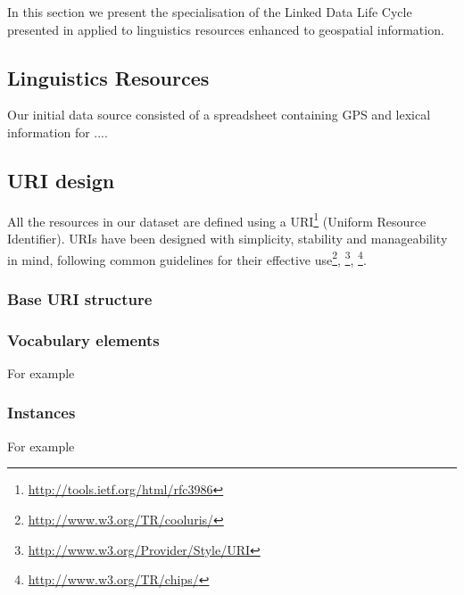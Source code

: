 In this section we present the specialisation of the Linked Data Life Cycle presented in \cite{Villazon_2011} applied to linguistics resources enhanced to geospatial information.

\subsection{Linguistics Resources}\label{sec:lr}

Our initial data source consisted of a spreadsheet containing GPS and lexical information for .... %

\subsection{URI design}
All the resources in our dataset are defined using a URI\footnote{\url{http://tools.ietf.org/html/rfc3986}} (Uniform Resource Identifier). URIs have been designed with simplicity, stability and manageability in mind, following common guidelines for their effective use\footnote{\url{http://www.w3.org/TR/cooluris/}}, \footnote{\url{http://www.w3.org/Provider/Style/URI}}, \footnote{\url{http://www.w3.org/TR/chips/}}.

\subsubsection{Base URI structure}


\subsubsection{Vocabulary elements}


For example


\subsubsection{Instances}


For example




